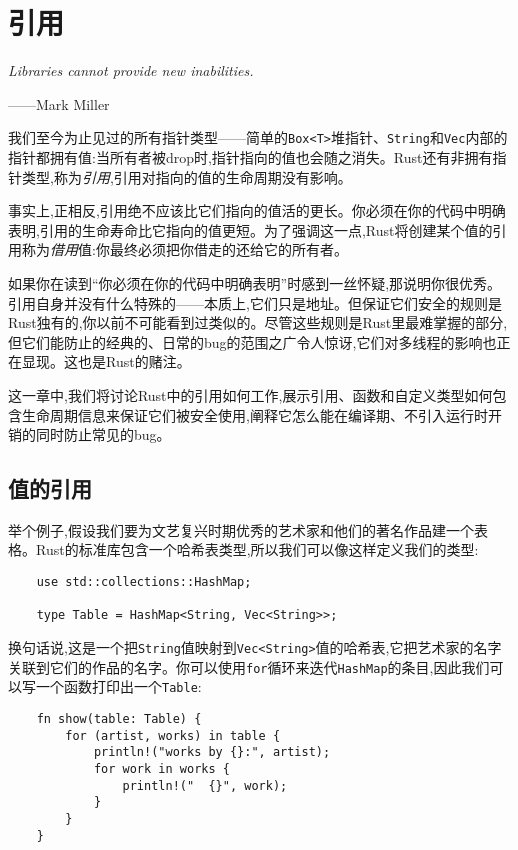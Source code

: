 \chapter{引用}\label{ch05}

\emph{Libraries cannot provide new inabilities.}

\begin{flushright}
——Mark Miller
\end{flushright}

我们至今为止见过的所有指针类型——简单的\texttt{Box<T>}堆指针、\texttt{String}和\texttt{Vec}内部的指针都拥有值:当所有者被drop时,指针指向的值也会随之消失。Rust还有非拥有指针类型,称为\emph{引用},引用对指向的值的生命周期没有影响。

事实上,正相反,引用绝不应该比它们指向的值活的更长。你必须在你的代码中明确表明,引用的生命寿命比它指向的值更短。为了强调这一点,Rust将创建某个值的引用称为\emph{借用}值:你最终必须把你借走的还给它的所有者。

如果你在读到“你必须在你的代码中明确表明”时感到一丝怀疑,那说明你很优秀。引用自身并没有什么特殊的——本质上,它们只是地址。但保证它们安全的规则是Rust独有的,你以前不可能看到过类似的。尽管这些规则是Rust里最难掌握的部分,但它们能防止的经典的、日常的bug的范围之广令人惊讶,它们对多线程的影响也正在显现。这也是Rust的赌注。

这一章中,我们将讨论Rust中的引用如何工作,展示引用、函数和自定义类型如何包含生命周期信息来保证它们被安全使用,阐释它怎么能在编译期、不引入运行时开销的同时防止常见的bug。

\section{值的引用}

举个例子,假设我们要为文艺复兴时期优秀的艺术家和他们的著名作品建一个表格。Rust的标准库包含一个哈希表类型,所以我们可以像这样定义我们的类型:
\begin{verbatim}
    use std::collections::HashMap;

    type Table = HashMap<String, Vec<String>>;
\end{verbatim}

换句话说,这是一个把\texttt{String}值映射到\texttt{Vec<String>}值的哈希表,它把艺术家的名字关联到它们的作品的名字。你可以使用\texttt{for}循环来迭代\texttt{HashMap}的条目,因此我们可以写一个函数打印出一个\texttt{Table}:
\begin{verbatim}
    fn show(table: Table) {
        for (artist, works) in table {
            println!("works by {}:", artist);
            for work in works {
                println!("  {}", work);
            }
        }
    }
\end{verbatim}

